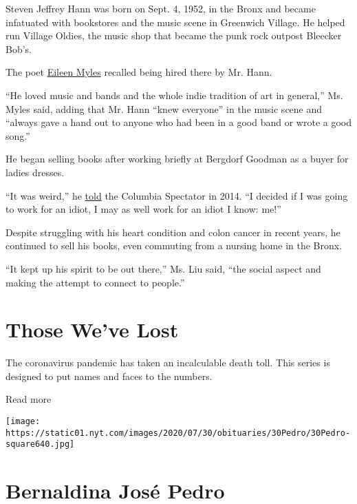 Steven Jeffrey Hann was born on Sept. 4, 1952, in the Bronx and became
infatuated with bookstores and the music scene in Greenwich Village. He
helped run Village Oldies, the music shop that became the punk rock
outpost Bleecker Bob's.

The poet
\href{https://www.nytimes.com/2016/01/31/nyregion/how-eileen-myles-poet-spends-her-sundays.html}{Eileen
Myles} recalled being hired there by Mr. Hann.

``He loved music and bands and the whole indie tradition of art in
general,'' Ms. Myles said, adding that Mr. Hann ``knew everyone'' in the
music scene and ``always gave a hand out to anyone who had been in a
good band or wrote a good song.''

He began selling books after working briefly at Bergdorf Goodman as a
buyer for ladies dresses.

``It was weird,'' he
\href{https://www.columbiaspectator.com/2014/04/17/bookseller-outside-milano-talks-about-cu-attitude-useless-mohi-restaurants-and-reading/}{told}
the Columbia Spectator in 2014. ``I decided if I was going to work for
an idiot, I may as well work for an idiot I know: me!''

Despite struggling with his heart condition and colon cancer in recent
years, he continued to sell his books, even commuting from a nursing
home in the Bronx.

``It kept up his spirit to be out there,'' Ms. Liu said, ``the social
aspect and making the attempt to connect to people.''

\href{https://www.nytimes.com/interactive/2020/obituaries/people-died-coronavirus-obituaries.html?action=click\&pgtype=Article\&state=default\&region=BELOW_MAIN_CONTENT\&context=covid_obits_promo}{}

\hypertarget{those-weve-lost}{%
\section{Those We've Lost}\label{those-weve-lost}}

The coronavirus pandemic has taken an incalculable death toll. This
series is designed to put names and faces to the numbers.

Read more

\texttt{[image: https://static01.nyt.com/images/2020/07/30/obituaries/30Pedro/30Pedro-square640.jpg]}

\hypertarget{bernaldina-josuxe9-pedro}{%
\section{Bernaldina José Pedro}\label{bernaldina-josuxe9-pedro}}

